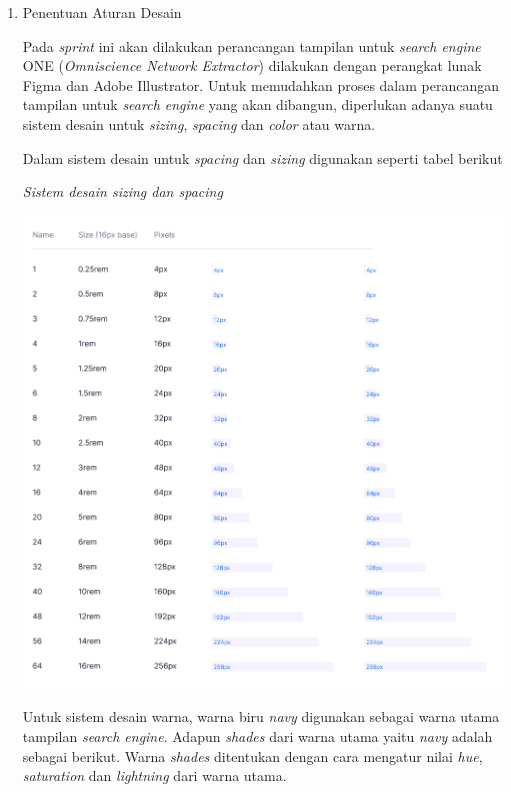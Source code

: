 \begin{enumerate}[label=\alph*)., leftmargin=1\parindent]
	\item{Penentuan Aturan Desain}
	
	Pada \textit{sprint} ini akan dilakukan perancangan tampilan untuk \textit{search engine} ONE (\textit{Omniscience Network Extractor}) dilakukan dengan perangkat lunak Figma dan Adobe Illustrator. Untuk memudahkan proses dalam perancangan tampilan untuk \textit{search engine} yang akan dibangun, diperlukan adanya suatu sistem desain untuk \textit{sizing}, \textit{spacing} dan \textit{color} atau warna.
	
	Dalam sistem desain untuk \textit{spacing} dan \textit{sizing} digunakan seperti tabel berikut
	
	\begin{table}[H]
		\caption{\textit{Sistem desain \textit{sizing} dan \textit{spacing}}}
		\label{Sistem desain sizing dan spacing}
		\includegraphics[keepaspectratio, width=13cm]{gambar/g-109.png}
	\end{table}
	
	Untuk sistem desain warna, warna biru \textit{navy} digunakan sebagai warna utama tampilan \textit{search engine}. Adapun \textit{shades} dari warna utama yaitu \textit{navy} adalah sebagai berikut. Warna \textit{shades} ditentukan dengan cara mengatur nilai \textit{hue}, \textit{saturation} dan \textit{lightning} dari warna utama.
	

\end{enumerate}
